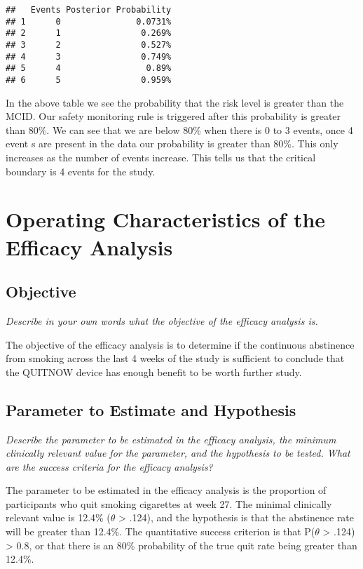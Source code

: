 \documentclass[
]{article}
\begin{document}
\begin{verbatim}
##   Events Posterior Probability
## 1      0               0.0731%
## 2      1                0.269%
## 3      2                0.527%
## 4      3                0.749%
## 5      4                 0.89%
## 6      5                0.959%
\end{verbatim}

In the above table we see the probability that the risk level is greater
than the MCID. Our safety monitoring rule is triggered after this
probability is greater than 80\%. We can see that we are below 80\% when
there is 0 to 3 events, once 4 event s are present in the data our
probability is greater than 80\%. This only increases as the number of
events increase. This tells us that the critical boundary is 4 events
for the study.

\newpage

\hypertarget{operating-characteristics-of-the-efficacy-analysis}{%
\section{Operating Characteristics of the Efficacy
Analysis}\label{operating-characteristics-of-the-efficacy-analysis}}

\hypertarget{objective}{%
\subsection{Objective}\label{objective}}

\emph{Describe in your own words what the objective of the efficacy
analysis is.}

The objective of the efficacy analysis is to determine if the continuous
abstinence from smoking across the last 4 weeks of the study is
sufficient to conclude that the QUITNOW device has enough benefit to be
worth further study.

\hypertarget{parameter-to-estimate-and-hypothesis-1}{%
\subsection{Parameter to Estimate and
Hypothesis}\label{parameter-to-estimate-and-hypothesis-1}}

\emph{Describe the parameter to be estimated in the efficacy analysis,
the minimum clinically relevant value for the parameter, and the
hypothesis to be tested. What are the success criteria for the efficacy
analysis?}

The parameter to be estimated in the efficacy analysis is the proportion
of participants who quit smoking cigarettes at week 27. The minimal
clinically relevant value is 12.4\% (\(\theta\) \textgreater{} .124),
and the hypothesis is that the abstinence rate will be greater than
12.4\%. The quantitative success criterion is that P(\(\theta\)
\textgreater{} .124) \textgreater{} 0.8, or that there is an 80\%
probability of the true quit rate being greater than 12.4\%.
\end{document}
